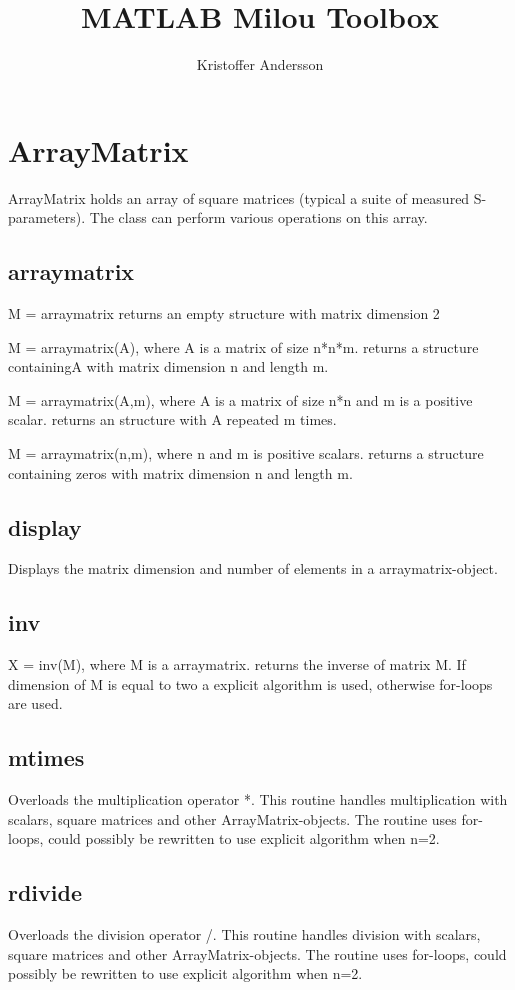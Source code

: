 \documentclass[11pt]{article}
\title{MATLAB Milou Toolbox}
\author{Kristoffer Andersson}
\begin{document}
\maketitle

\section{ArrayMatrix}
ArrayMatrix holds an array of square matrices (typical a suite of measured S-parameters). The class can perform various operations on this array.

\subsection*{arraymatrix}
M = arraymatrix
returns an empty structure with matrix dimension 2

M = arraymatrix(A), where A is a matrix of size n*n*m.
returns a structure containingA with matrix dimension n and length m.

M = arraymatrix(A,m), where A is a matrix of size n*n and m is a positive scalar.
returns an structure with A repeated m times.

M = arraymatrix(n,m), where n and m is positive scalars.
returns a structure containing zeros with matrix dimension n and length m.

\subsection*{display}
Displays the matrix dimension and number of elements in a arraymatrix-object.

\subsection*{inv}
X = inv(M), where M is a arraymatrix.
returns the inverse of matrix M. If dimension of M is equal to two a explicit algorithm is used, otherwise for-loops are used.

\subsection*{mtimes}
Overloads the multiplication operator *. This routine handles multiplication with scalars, square matrices and other ArrayMatrix-objects. The routine uses for-loops, could possibly be rewritten to use explicit algorithm when n=2.

\subsection*{rdivide}
Overloads the division operator /. This routine handles division with scalars, square matrices and other ArrayMatrix-objects. The routine uses for-loops, could possibly be rewritten to use explicit algorithm when n=2.
\end{document}
